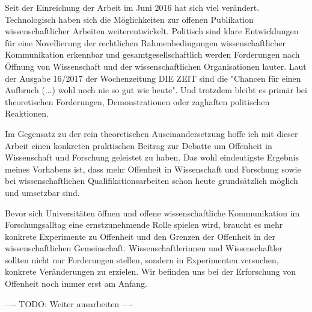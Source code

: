 Seit der Einreichung der Arbeit im Juni 2016 hat sich viel verändert. Technologisch haben sich die Möglichkeiten zur offenen Publikation wissenschaftlicher Arbeiten weiterentwickelt. Politisch sind klare Entwicklungen für eine Novellierung der rechtlichen Rahmenbedingungen wissenschaftlicher Kommunikation erkennbar und gesamtgesellschaftlich werden Forderungen nach Öffnung von Wissenschaft und der wissenschaftlichen Organisationen lauter. Laut der Ausgabe 16/2017 der Wochenzeitung DIE ZEIT sind die "Chancen für einen Aufbruch (...) wohl noch nie so gut wie heute". Und trotzdem bleibt es primär bei theoretischen Forderungen, Demonstrationen oder zaghaften politischen Reaktionen.

Im Gegensatz zu der rein theoretischen Auseinandersetzung hoffe ich mit dieser Arbeit einen konkreten praktischen Beitrag zur Debatte um Offenheit in Wissenschaft und Forschung geleistet zu haben. Das wohl eindeutigste Ergebnis meines Vorhabens ist, dass mehr Offenheit in Wissenschaft und Forschung sowie bei wissenschaftlichen Qualifikationsarbeiten schon heute grundsätzlich möglich und umsetzbar sind.

Bevor sich Universitäten öffnen und offene wissenschaftliche Kommunikation im Forschungsalltag eine ernstzunehmende Rolle spielen wird, braucht es mehr konkrete Experimente zu Offenheit und den Grenzen der Offenheit in der wissenschaftlichen Gemeinschaft. Wissenschaftlerinnen und Wissenschaftler sollten nicht nur Forderungen stellen, sondern in Experimenten versuchen, konkrete Veränderungen zu erzielen. Wir befinden uns bei der Erforschung von Offenheit noch immer erst am Anfang.

---- TODO: Weiter ausarbeiten ----
